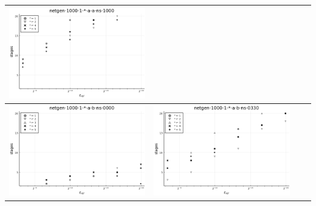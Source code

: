 \documentclass{article}
\begin{document}
\begin{landscape}
\begin{center}
\begin{longtable}{| c | c | c | c |}
\includegraphics[height=0.22\textheight]{hiter_fixlim_netgen-1000-1-_-a-a-ns-1000.png} \\
                \hline
\includegraphics[height=0.22\textheight]{hiter_fixlim_netgen-1000-1-_-a-b-ns-0000.png} &
\includegraphics[height=0.22\textheight]{hiter_fixlim_netgen-1000-1-_-a-b-ns-0330.png} &

\end{longtable}
\end{center}
\end{landscape}
\end{document}
